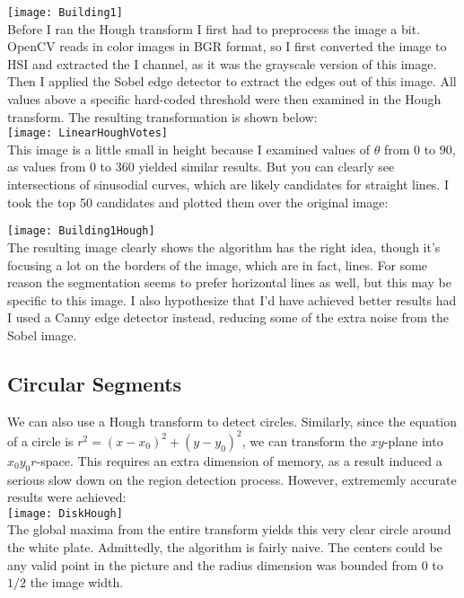 \documentclass[12pt]{article}
\begin{document}
\texttt{[image: Building1]}\\

Before I ran the Hough transform I first had to preprocess the image a bit.
OpenCV reads in color images in BGR format, so I first converted the image to
HSI and extracted the I channel, as it was the grayscale
version of this image. Then I applied the Sobel edge detector to extract the
edges out of this image. All values above a specific hard-coded threshold were
then examined in the Hough transform. The resulting transformation is shown
below:\\

\texttt{[image: LinearHoughVotes]}\\

This image is a little small in height because I examined values of $\theta$
from $0$ to $90$, as values from $0$ to $360$ yielded similar results. But you
can clearly see intersections of sinusodial curves, which are likely candidates
for straight lines. I took the top 50 candidates and plotted them over the
original image:

\texttt{[image: Building1Hough]}\\

The resulting image clearly shows the algorithm has the right idea, though it's
focusing a lot on the borders of the image, which are in fact, lines. For some
reason the segmentation seems to prefer horizontal lines as well, but this may
be specific to this image. I also hypothesize that I'd have achieved better
results had I used a Canny edge detector instead, reducing some of the extra
noise from the Sobel image.

\subsection{Circular Segments}

We can also use a Hough transform to detect circles. Similarly, since the
equation of a circle is $r^2 = {(x - x_0)}^2 + {(y - y_0)}^2$, we can transform the
$xy$-plane into $x_0y_0r$-space. This requires an extra dimension of memory, as
a result induced a serious slow down on the region detection process. However,
extrememly accurate results were achieved:\\

\texttt{[image: DiskHough]}\\

The global maxima from the entire transform yields this very clear circle around
the white plate. Admittedly, the algorithm is fairly naive. The centers could be
any valid point in the picture and the radius dimension was bounded from $0$ to
$1/2$ the image width.
\end{document}

